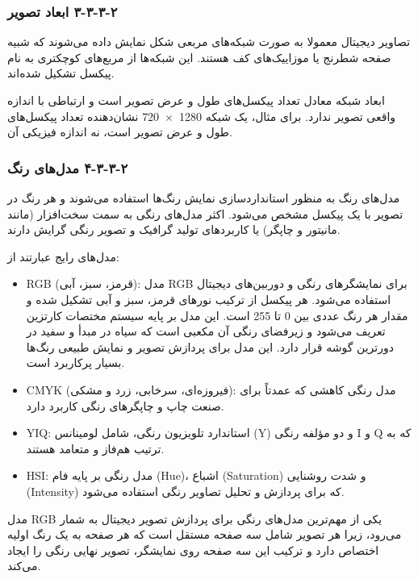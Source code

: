 \subsubsection{‏۲‏-‏۳‏-‏۳‏-‏۳‏ ابعاد تصویر}

تصاویر دیجیتال معمولا به صورت شبکه‌های مربعی شکل نمایش داده می‌شوند که شبیه صفحه شطرنج یا موزاییک‌های کف هستند. این شبکه‌ها از مربع‌های کوچکتری به نام پیکسل تشکیل شده‌اند.

ابعاد شبکه معادل تعداد پیکسل‌های طول و عرض تصویر است و ارتباطی با اندازه واقعی تصویر ندارد. برای مثال، یک شبکه 1280 × 720 نشان‌دهنده تعداد پیکسل‌های طول و عرض تصویر است، نه اندازه فیزیکی آن\cite{ref42}.

\subsubsection{‏۲‏-‏۳‏-‏۳‏-‏۴‏ مدل‌های رنگ}

مدل‌های رنگ به منظور استانداردسازی نمایش رنگ‌ها استفاده می‌شوند و هر رنگ در تصویر با یک پیکسل مشخص می‌شود. اکثر مدل‌های رنگی به سمت سخت‌افزار (مانند مانیتور و چاپگر) یا کاربردهای تولید گرافیک و تصویر رنگی گرایش دارند\cite{ref43}.

مدل‌های رایج عبارتند از:

\begin{itemize}
    \item RGB (قرمز، سبز، آبی): مدل RGB برای نمایشگرهای رنگی و دوربین‌های دیجیتال استفاده می‌شود. هر پیکسل از ترکیب نورهای قرمز، سبز و آبی تشکیل شده و مقدار هر رنگ عددی بین 0 تا 255 است. این مدل بر پایه سیستم مختصات کارتزین تعریف می‌شود و زیرفضای رنگی آن مکعبی است که سیاه در مبدأ و سفید در دورترین گوشه قرار دارد. این مدل برای پردازش تصویر و نمایش طبیعی رنگ‌ها بسیار پرکاربرد است.
    \item CMYK (فیروزه‌ای، سرخابی، زرد و مشکی): مدل رنگی کاهشی که عمدتاً برای صنعت چاپ و چاپگرهای رنگی کاربرد دارد.
    \item YIQ: استاندارد تلویزیون رنگی، شامل لومینانس (Y) و دو مؤلفه رنگی I و Q که به ترتیب هم‌فاز و متعامد هستند.
    \item HSI: مدل رنگی بر پایه فام (Hue)، اشباع (Saturation) و شدت روشنایی (Intensity) که برای پردازش و تحلیل تصاویر رنگی استفاده می‌شود.
\end{itemize}

مدل RGB یکی از مهم‌ترین مدل‌های رنگی برای پردازش تصویر دیجیتال به شمار می‌رود، زیرا هر تصویر شامل سه صفحه مستقل است که هر صفحه به یک رنگ اولیه اختصاص دارد و ترکیب این سه صفحه روی نمایشگر، تصویر نهایی رنگی را ایجاد می‌کند.

